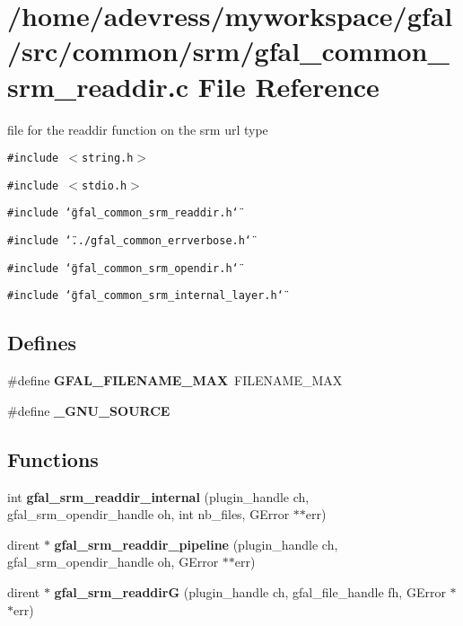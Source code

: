 \section{/home/adevress/myworkspace/gfal/src/common/srm/gfal\_\-common\_\-srm\_\-readdir.c File Reference}
\label{gfal__common__srm__readdir_8c}
file for the readdir function on the srm url type 

{\tt \#include $<$string.h$>$}\par
{\tt \#include $<$stdio.h$>$}\par
{\tt \#include \char`\"{}gfal\_\-common\_\-srm\_\-readdir.h\char`\"{}}\par
{\tt \#include \char`\"{}../gfal\_\-common\_\-errverbose.h\char`\"{}}\par
{\tt \#include \char`\"{}gfal\_\-common\_\-srm\_\-opendir.h\char`\"{}}\par
{\tt \#include \char`\"{}gfal\_\-common\_\-srm\_\-internal\_\-layer.h\char`\"{}}\par
\subsection*{Defines}
\begin{CompactItemize}
\item 
\#define \textbf{GFAL\_\-FILENAME\_\-MAX}~FILENAME\_\-MAX\label{gfal__common__srm__readdir_8c_595a5b00305895e25ce0e00b177fd8a8}

\item 
\#define \textbf{\_\-GNU\_\-SOURCE}\label{gfal__common__srm__readdir_8c_53abf256730d533302d1910e5fb61efe}

\end{CompactItemize}
\subsection*{Functions}
\begin{CompactItemize}
\item 
int \textbf{gfal\_\-srm\_\-readdir\_\-internal} (plugin\_\-handle ch, gfal\_\-srm\_\-opendir\_\-handle oh, int nb\_\-files, GError $\ast$$\ast$err)\label{gfal__common__srm__readdir_8c_83a9d4f97ba144ace7d46dedae0d7ec9}

\item 
dirent $\ast$ \textbf{gfal\_\-srm\_\-readdir\_\-pipeline} (plugin\_\-handle ch, gfal\_\-srm\_\-opendir\_\-handle oh, GError $\ast$$\ast$err)\label{gfal__common__srm__readdir_8c_5ffde8e4582f313779fe85d54d9aeee8}

\item 
dirent $\ast$ \textbf{gfal\_\-srm\_\-readdir\-G} (plugin\_\-handle ch, gfal\_\-file\_\-handle fh, GError $\ast$$\ast$err)\label{gfal__common__srm__readdir_8c_f94cfcd3e4eb1aff77ad898a13d49e22}

\end{CompactItemize}


